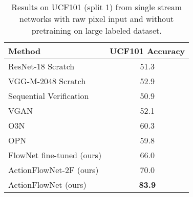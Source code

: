 \documentclass[10pt,twocolumn,letterpaper]{article}
\begin{document}
\begin{table}[h!]
  \vspace{-.5em}
\begin{center}
    \begin{tabular}{l|c}
      \hline
      Method & UCF101 Accuracy \\
    \hline\hline
    ResNet-18 Scratch         & 51.3 \\
    VGG-M-2048 Scratch~\cite{simonyanZ14a} & 52.9 \\
Sequential Verification~\cite{misra2016shuffle} & 50.9 \\
    VGAN~\cite{vondrick2016generating} & 52.1 \\
    O3N~\cite{fernando2016self} & 60.3 \\
    OPN~\cite{lee2017unsupervised} & 59.8 \\
    \hline
    FlowNet fine-tuned (ours) & 66.0 \\
    ActionFlowNet-2F (ours)  & 70.0 \\
    \hline
    ActionFlowNet (ours)  & \textbf{83.9} \\
      \hline
    \end{tabular}
    \vspace{-1em}
\end{center}
  \caption{Results on UCF101 (split 1) from single stream networks with raw pixel input and without pretraining on large labeled dataset.}
  \vspace{-1em}
\label{tab:compare_recent}
\end{table}
\end{document}
